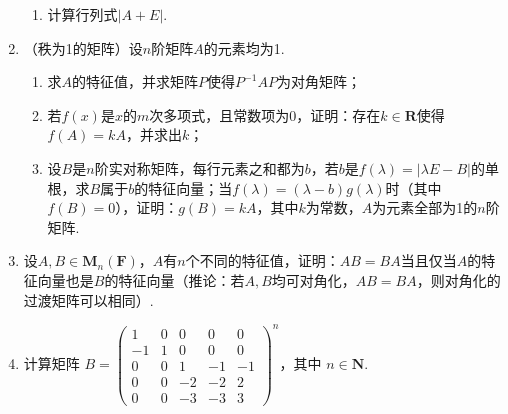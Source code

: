 \begin{enumerate}
\begin{enumerate}
              \item 计算行列式$|A+E|$.
          \end{enumerate}

    \item （秩为1的矩阵）设$n$阶矩阵$A$的元素均为1.
          \begin{enumerate}
              \item 求$A$的特征值，并求矩阵$P$使得$P^{-1}AP$为对角矩阵；

              \item 若$f(x)$是$x$的$m$次多项式，且常数项为0，证明：存在$k\in\mathbf{R}$使得$f(A)=kA$，并求出$k$；

              \item 设$B$是$n$阶实对称矩阵，每行元素之和都为$b$，若$b$是$f(\lambda)=|\lambda E-B|$的单根，求$B$属于$b$的特征向量；当$f(\lambda)=(\lambda-b)g(\lambda)$时（其中$f(B)=0$），证明：$g(B)=kA$，其中$k$为常数，$A$为元素全部为1的$n$阶矩阵.
          \end{enumerate}

    \item 设$A,B\in \mathbf{M}_n(\mathbf{F})$，$A$有$n$个不同的特征值，证明：$AB=BA$当且仅当$A$的特征向量也是$B$的特征向量（推论：若$A,B$均可对角化，$AB=BA$，则对角化的过渡矩阵可以相同）.

    \item 计算矩阵 $B=\begin{pmatrix}1 & 0 & 0 & 0 & 0 \\ -1 & 1 & 0 & 0 & 0 \\ 0 & 0 & 1 & -1 & -1 \\ 0 & 0 & -2 & -2 & 2 \\ 0 & 0 & -3 & -3 & 3\end{pmatrix}^n$，其中 $n\in\mathbf{N}$.
\end{enumerate}

